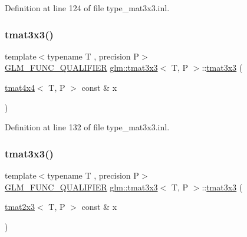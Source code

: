 Definition at line 124 of file type\+\_\+mat3x3.\+inl.

\mbox{\label{structglm_1_1tmat3x3_a802f89baac6ac79fe657088c95308c7b}} 
\subsubsection{\texorpdfstring{tmat3x3()}{tmat3x3()}\hspace{0.1cm}{\footnotesize\ttfamily [12/22]}}
{\footnotesize\ttfamily template$<$typename T , precision P$>$ \\
\mbox{\hyperlink{setup_8hpp_a33fdea6f91c5f834105f7415e2a64407}{G\+L\+M\+\_\+\+F\+U\+N\+C\+\_\+\+Q\+U\+A\+L\+I\+F\+I\+ER}} \mbox{\hyperlink{structglm_1_1tmat3x3}{glm\+::tmat3x3}}$<$ T, P $>$\+::\mbox{\hyperlink{structglm_1_1tmat3x3}{tmat3x3}} (\begin{DoxyParamCaption}\item[{\mbox{\hyperlink{structglm_1_1tmat4x4}{tmat4x4}}$<$ T, P $>$ const \&}]{x }\end{DoxyParamCaption})}



Definition at line 132 of file type\+\_\+mat3x3.\+inl.

\mbox{\label{structglm_1_1tmat3x3_aedf6749905c8adde35f51c14c50197db}} 
\subsubsection{\texorpdfstring{tmat3x3()}{tmat3x3()}\hspace{0.1cm}{\footnotesize\ttfamily [13/22]}}
{\footnotesize\ttfamily template$<$typename T , precision P$>$ \\
\mbox{\hyperlink{setup_8hpp_a33fdea6f91c5f834105f7415e2a64407}{G\+L\+M\+\_\+\+F\+U\+N\+C\+\_\+\+Q\+U\+A\+L\+I\+F\+I\+ER}} \mbox{\hyperlink{structglm_1_1tmat3x3}{glm\+::tmat3x3}}$<$ T, P $>$\+::\mbox{\hyperlink{structglm_1_1tmat3x3}{tmat3x3}} (\begin{DoxyParamCaption}\item[{\mbox{\hyperlink{structglm_1_1tmat2x3}{tmat2x3}}$<$ T, P $>$ const \&}]{x }\end{DoxyParamCaption})}



